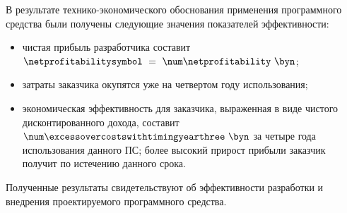 В результате технико-экономического обоснования применения программного средства были получены следующие значения показателей эффективности:

\begin{itemize}
	\item чистая прибыль разработчика составит $\netprofitabilitysymbol~=~\netprofitabilityvalue~\byn$;
	\item затраты заказчика окупятся уже на четвертом году использования;
	\item экономическая эффективность для заказчика, выраженная в виде чистого дисконтированного дохода, составит $\excessovercostswithtimingyearthreevalue~\byn$ за четыре года использования данного ПС; более высокий прирост прибыли заказчик получит по истечению данного срока.
\end{itemize}

Полученные результаты свидетельствуют об эффективности разработки и внедрения проектируемого программного средства.
